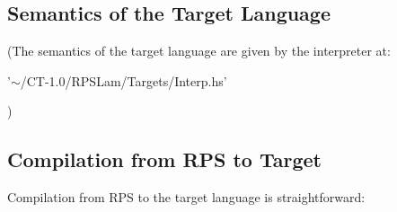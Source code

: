 \documentclass[a4paper,10pt]{article}
\begin{document}
\subsection{Semantics of the Target Language}

(The semantics of the target language are given by the interpreter at:

'$\sim$/CT-1.0/RPSLam/Targets/Interp.hs'

)

\subsection{Compilation from RPS to Target}

Compilation from RPS to the target language is straightforward:\\
\end{document}
